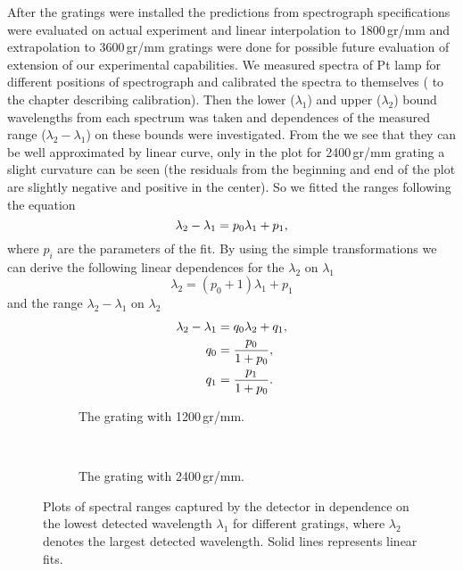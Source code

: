 After the gratings were installed the predictions from spectrograph
specifications were evaluated on actual experiment and linear interpolation to
1800\,gr/mm and extrapolation to 3600\,gr/mm gratings were done for possible
future evaluation of extension of our experimental capabilities. We measured
spectra of Pt lamp for different positions of spectrograph and calibrated the
spectra to themselves
(\REFERENCE{} to the chapter describing calibration).
Then the lower ($\lambda_1$) and upper ($\lambda_2$) bound wavelengths from
each spectrum was taken and dependences of the measured range
($\lambda_2 - \lambda_1$) on these bounds were investigated. From the
we see that they can be well approximated by linear curve, only in the plot
for 2400\,gr/mm grating a slight curvature can be seen (the residuals from
the beginning and end of the plot are slightly negative and positive in the
center). So we fitted the ranges following the equation
\begin{equation}
	\lambda_2 - \lambda_1 = p_0 \lambda_1 + p_1,
	\label{\eqnlabel{spectrograph_selection:spectral_range_max_meas}}
\end{equation}
where $p_i$ are the parameters of the fit. By using the simple transformations
we can derive the following linear dependences for the $\lambda_2$ on
$\lambda_1$
\begin{equation}
	\lambda_2 = (p_0 + 1) \lambda_1 + p_1
\end{equation}
and the range $\lambda_2 - \lambda_1$ on $\lambda_2$
\begin{align}
	\lambda_2 - \lambda_1 &= q_0 \lambda_2 + q_1,
	\label{\eqnlabel{spectrograph_selection:spectral_range_min_meas}} \\
	q_0 &= \frac{p_0}{1 + p_0}, \nonumber\\
	q_1 &= \frac{p_1}{1 + p_0}. \nonumber
\end{align}

\begin{figure}
	\centering
	\begin{subfigure}[b]{1\textwidth}
		\centering
		
		\caption{The grating with 1200\,gr/mm.}
		\label{\figlabel{spectrograph_selection:dipsersion_range_1200}}
	\end{subfigure}
	\\
	\begin{subfigure}[b]{1\textwidth}
		\centering
		
		\caption{The grating with 2400\,gr/mm.}
		\label{\figlabel{spectrograph_selection:dipsersion_range_2400}}
	\end{subfigure}
	\caption{Plots of spectral ranges captured by the detector in dependence on
		the lowest detected wavelength $\lambda_1$ for different gratings, where
		$\lambda_2$ denotes the largest detected wavelength. Solid lines
		represents linear fits.}
	\label{\figlabel{spectrograph_selection:dispersion_range}}
\end{figure}

